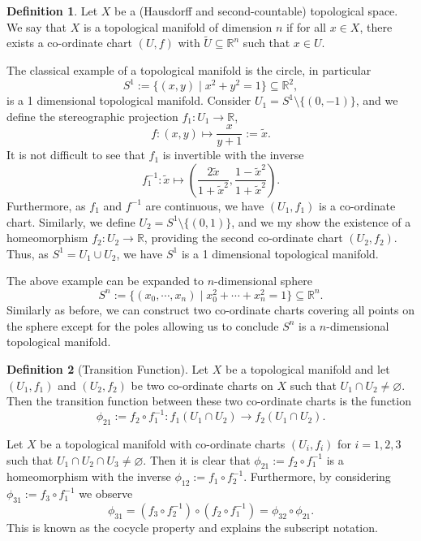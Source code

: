 \documentclass[]{article}
\theoremstyle{definition}
\theoremstyle{definition}
\newtheorem{definition}{Definition}[section]
\begin{document}
\begin{definition}
  Let \(X\) be a (Hausdorff and second-countable) topological space. We say 
  that \(X\) is a topological manifold of dimension \(n\) if for all 
  \(x \in X\), there exists a co-ordinate chart \((U, f)\) with 
  \(\tilde U \subseteq \mathbb{R}^n\) such that \(x \in U\).
\end{definition}

The classical example of a topological manifold is the circle, in particular 
\[S^1 := \{(x, y) \mid x^2 + y^2 = 1\} \subseteq \mathbb{R}^2,\]
is a 1 dimensional topological manifold. Consider \(U_1 = S^1 \setminus \{(0, -1)\}\),
and we define the stereographic projection \(f_1 : U_1 \to \mathbb{R}\), 
\[f : (x, y) \mapsto \frac{x}{y + 1} := \tilde x.\]
It is not difficult to see that \(f_1\) is invertible with the inverse 
\[f_1^{-1} : \tilde x \mapsto \left(\frac{2\tilde x}{1 + {\tilde x}^2}, 
  \frac{1 - {\tilde x}^2}{1 + {\tilde x}^2}\right).\]
Furthermore, as \(f_1\) and \(f^{-1}\) are continuous, we have \((U_1, f_1)\) is 
a co-ordinate chart. Similarly, we define \(U_2 = S^1 \setminus \{(0, 1)\}\), 
and we my show the existence of a homeomorphism \(f_2 : U_2 \to \mathbb{R}\), 
providing the second co-ordinate chart \((U_2, f_2)\). Thus, as 
\(S^1 = U_1 \cup U_2\), we have \(S^1\) is a 1 dimensional topological manifold.

The above example can be expanded to \(n\)-dimensional sphere 
\[S^n := \{(x_0, \cdots, x_n) \mid x_0^2 + \cdots + x_n^2 = 1\} 
  \subseteq \mathbb{R}^n.\]
Similarly as before, we can construct two co-ordinate charts covering all points 
on the sphere except for the poles allowing us to conclude \(S^n\) is a 
\(n\)-dimensional topological manifold.

\begin{definition}[Transition Function]
  Let \(X\) be a topological manifold and let \((U_1, f_1)\) and \((U_2, f_2)\) 
  be two co-ordinate charts on \(X\) such that \(U_1 \cap U_2 \neq \varnothing\). 
  Then the transition function between these two co-ordinate charts is the 
  function 
  \[\phi_{21} := f_2 \circ f_1^{-1} : f_1(U_1 \cap U_2) \to f_2(U_1 \cap U_2).\]
\end{definition}

Let \(X\) be a topological manifold with co-ordinate charts \((U_i, f_i)\) for 
\(i = 1, 2, 3\) such that \(U_1 \cap U_2 \cap U_3 \neq \varnothing\). Then it 
is clear that \(\phi_{21} := f_2 \circ f_1^{-1}\) is a homeomorphism with 
the inverse \(\phi_{12} := f_1 \circ f_2^{-1}\). Furthermore, by considering 
\(\phi_{31} := f_3 \circ f_1^{-1}\) we observe 
\[\phi_{31} = (f_3 \circ f_2^{-1}) \circ (f_2 \circ f_1^{-1}) = 
  \phi_{32} \circ \phi_{21}.\]
This is known as the cocycle property and explains the subscript notation.
\end{document}
